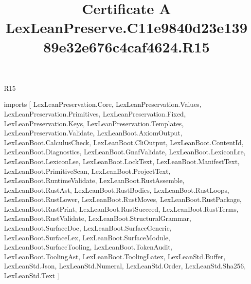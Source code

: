 \begin{lexlean}{R15}
\title{Certificate A LexLeanPreserve.C11e9840d23e13989e32e676c4caf4624.R15}
\begin{coremodule}
imports [
  LexLeanPreservation.Core,
  LexLeanPreservation.Values,
  LexLeanPreservation.Primitives,
  LexLeanPreservation.Fixed,
  LexLeanPreservation.Keys,
  LexLeanPreservation.Templates,
  LexLeanPreservation.Validate,
  LexLeanBoot.AxiomOutput,
  LexLeanBoot.CalculusCheck,
  LexLeanBoot.CliOutput,
  LexLeanBoot.ContentId,
  LexLeanBoot.Diagnostics,
  LexLeanBoot.GnafValidate,
  LexLeanBoot.LexiconLre,
  LexLeanBoot.LexiconLse,
  LexLeanBoot.LockText,
  LexLeanBoot.ManifestText,
  LexLeanBoot.PrimitiveScan,
  LexLeanBoot.ProjectText,
  LexLeanBoot.RuntimeValidate,
  LexLeanBoot.RustAssemble,
  LexLeanBoot.RustAst,
  LexLeanBoot.RustBodies,
  LexLeanBoot.RustLoops,
  LexLeanBoot.RustLower,
  LexLeanBoot.RustMoves,
  LexLeanBoot.RustPackage,
  LexLeanBoot.RustPrint,
  LexLeanBoot.RustSucceed,
  LexLeanBoot.RustTerms,
  LexLeanBoot.RustValidate,
  LexLeanBoot.StructuralGrammar,
  LexLeanBoot.SurfaceDoc,
  LexLeanBoot.SurfaceGeneric,
  LexLeanBoot.SurfaceLex,
  LexLeanBoot.SurfaceModule,
  LexLeanBoot.SurfaceTooling,
  LexLeanBoot.TokenAudit,
  LexLeanBoot.ToolingAst,
  LexLeanBoot.ToolingLatex,
  LexLeanStd.Buffer,
  LexLeanStd.Json,
  LexLeanStd.Numeral,
  LexLeanStd.Order,
  LexLeanStd.Sha256,
  LexLeanStd.Text
]


\end{coremodule}
\end{lexlean}

